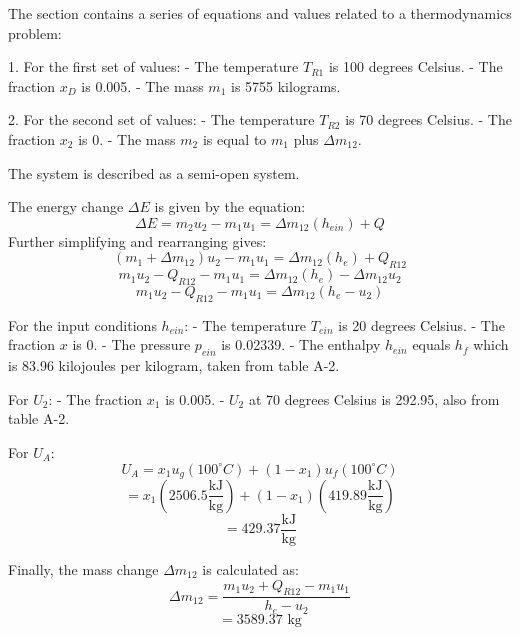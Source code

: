 The section contains a series of equations and values related to a thermodynamics problem:

1. For the first set of values:
   - The temperature \( T_{R1} \) is 100 degrees Celsius.
   - The fraction \( x_D \) is 0.005.
   - The mass \( m_1 \) is 5755 kilograms.

2. For the second set of values:
   - The temperature \( T_{R2} \) is 70 degrees Celsius.
   - The fraction \( x_2 \) is 0.
   - The mass \( m_2 \) is equal to \( m_1 \) plus \( \Delta m_{12} \).

The system is described as a semi-open system.

The energy change \( \Delta E \) is given by the equation:
\[ \Delta E = m_2 u_2 - m_1 u_1 = \Delta m_{12} (h_{ein}) + Q \]
Further simplifying and rearranging gives:
\[ (m_1 + \Delta m_{12}) u_2 - m_1 u_1 = \Delta m_{12} (h_e) + Q_{R12} \]
\[ m_1 u_2 - Q_{R12} - m_1 u_1 = \Delta m_{12} (h_e) - \Delta m_{12} u_2 \]
\[ m_1 u_2 - Q_{R12} - m_1 u_1 = \Delta m_{12} (h_e - u_2) \]

For the input conditions \( h_{ein} \):
- The temperature \( T_{ein} \) is 20 degrees Celsius.
- The fraction \( x \) is 0.
- The pressure \( p_{ein} \) is 0.02339.
- The enthalpy \( h_{ein} \) equals \( h_f \) which is 83.96 kilojoules per kilogram, taken from table A-2.

For \( U_2 \):
- The fraction \( x_1 \) is 0.005.
- \( U_2 \) at 70 degrees Celsius is 292.95, also from table A-2.

For \( U_A \):
\[ U_A = x_1 u_g (100^\circ C) + (1 - x_1) u_f (100^\circ C) \]
\[ = x_1 \left( 2506.5 \frac{\text{kJ}}{\text{kg}} \right) + (1 - x_1) \left( 419.89 \frac{\text{kJ}}{\text{kg}} \right) \]
\[ = 429.37 \frac{\text{kJ}}{\text{kg}} \]

Finally, the mass change \( \Delta m_{12} \) is calculated as:
\[ \Delta m_{12} = \frac{m_1 u_2 + Q_{R12} - m_1 u_1}{h_e - u_2} \]
\[ = 3589.37 \text{ kg} \]
